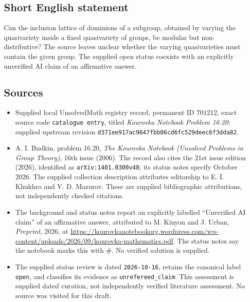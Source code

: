 \documentclass[11pt]{article}
\begin{document}
\subsection{Short English statement}
Can the inclusion lattice of dominions of a subgroup, obtained by varying the quasivariety inside a fixed quasivariety of groups, be modular but non-distributive? The source leaves unclear whether the varying quasivarieties must contain the given group. The supplied open status coexists with an explicitly unverified AI claim of an affirmative answer.
\subsection{Sources}
\begin{itemize}
\item Supplied local UnsolvedMath registry record, permanent ID \(701212\), exact source code \texttt{catalogue entry}, titled \emph{Kourovka Notebook Problem 16.20}; supplied upstream revision \texttt{d371ee917ac9647fbb06cd6fc529deec6f3dda82}.
\item A. I. Budkin, problem 16.20, \emph{The Kourovka Notebook (Unsolved Problems in Group Theory)}, 16th issue (2006). The record also cites the 21st issue edition (2026), identified as \texttt{arXiv:1401.0300v48}; its status notes specify October 2026. The supplied collection description attributes editorship to E. I. Khukhro and V. D. Mazurov. These are supplied bibliographic attributions, not independently checked citations.
\item The background and status notes report an explicitly labelled ``Unverified AI claim'' of an affirmative answer, attributed to M. Kinyon and J. Urban, \emph{Preprint}, 2026, at \url{https://kourovkanotebookorg.wordpress.com/wp-content/uploads/2026/09/kourovka-mathematics.pdf}. The status notes say the notebook marks this with \(\#\). No verified solution is supplied.
\item The supplied status review is dated \texttt{2026-10-16}, retains the canonical label \texttt{open}, and classifies its evidence as \texttt{unrefereed\_claim}. This assessment is supplied dated curation, not independently verified literature assessment. No source was visited for this draft.
\end{itemize}
\end{document}
